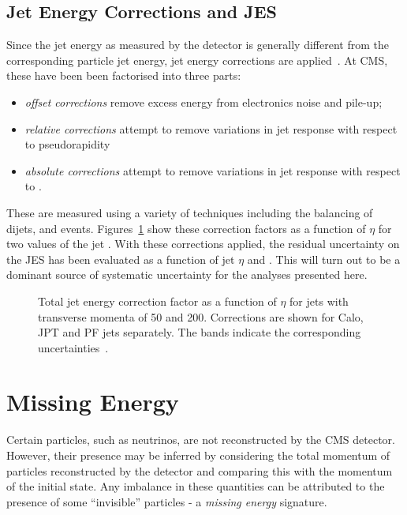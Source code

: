 \subsection{Jet Energy Corrections and \acl{JES}}
Since the jet energy as measured by the detector is generally different from the
corresponding particle jet energy, jet energy corrections are
applied~\cite{jet_energy_cms, jet_energy_pas}. At \ac{CMS}, these have been been
factorised into three parts:
\begin{itemize}
\item \emph{offset corrections} remove excess energy from electronics noise and
  pile-up;
\item \emph{relative corrections} attempt to remove variations in jet response
  with respect to pseudorapidity
\item \emph{absolute corrections} attempt to remove variations in jet response
  with respect to \Pt.
\end{itemize}
These are measured using a variety of techniques including the balancing of
dijets, \gammajets and \Zjets events. Figures~\ref{fig:reco_jet_energy_corr}
show these correction factors as a function of $\eta$ for two values of the jet
\Pt. With these corrections applied, the residual uncertainty on the \ac{JES}
has been evaluated as a function of jet $\eta$ and \Pt. This will turn out to be
a dominant source of systematic uncertainty for the analyses presented here.

\begin{figure}
  \centering
  \quad
  \quad
  \caption[Total jet energy correction factor as a function of $\eta$ for jets
  with transverse momenta of \unit{50}{\GeV} and \unit{200}{\GeV}]{Total jet
    energy correction factor as a function of $\eta$ for jets with transverse
    momenta of \unit{50}{\GeV} and \unit{200}{\GeV}. Corrections are shown for
    \ac{Calo}, \ac{JPT} and \ac{PF} jets separately. The bands indicate the
    corresponding uncertainties~\cite{jet_energy_pas}.}
  \label{fig:reco_jet_energy_corr}
\end{figure}

\section{Missing Energy}
Certain particles, such as neutrinos, are not reconstructed by the \ac{CMS}
detector. However, their presence may be inferred by considering the total
momentum of particles reconstructed by the detector and comparing this with the
momentum of the initial state. Any imbalance in these quantities can be
attributed to the presence of some ``invisible'' particles - a \emph{missing
  energy} signature.


